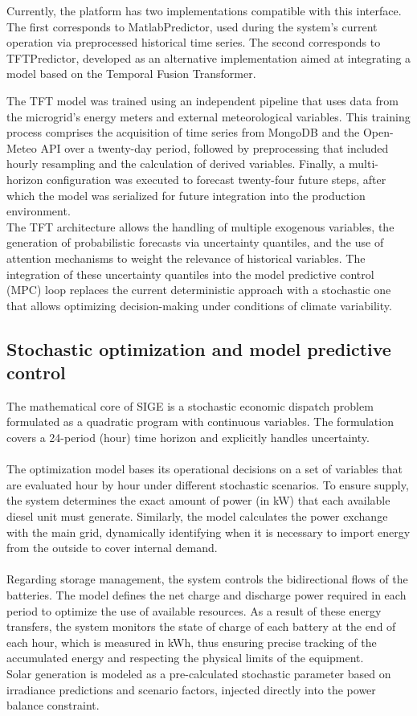 \documentclass[journal,article,submit,pdftex,moreauthors]{Definitions/mdpi}
\begin{document}
Currently, the platform has two implementations compatible with this interface. The first corresponds to MatlabPredictor, used during the system's current operation via preprocessed historical time series. The second corresponds to TFTPredictor, developed as an alternative implementation aimed at integrating a model based on the Temporal Fusion Transformer.

The TFT model was trained using an independent pipeline that uses data from the microgrid's energy meters and external meteorological variables. This training process comprises the acquisition of time series from MongoDB and the Open-Meteo API over a twenty-day period, followed by preprocessing that included hourly resampling and the calculation of derived variables. Finally, a multi-horizon configuration was executed to forecast twenty-four future steps, after which the model was serialized for future integration into the production environment.
\\
The TFT architecture allows the handling of multiple exogenous variables, the generation of probabilistic forecasts via uncertainty quantiles, and the use of attention mechanisms to weight the relevance of historical variables. The integration of these uncertainty quantiles into the model predictive control (MPC) loop replaces the current deterministic approach with a stochastic one that allows optimizing decision-making under conditions of climate variability.

\subsection{Stochastic optimization and model predictive control}

The mathematical core of SIGE is a stochastic economic dispatch problem formulated as a quadratic program with continuous variables. The formulation covers a 24-period (hour) time horizon and explicitly handles uncertainty.
\\\\
The optimization model bases its operational decisions on a set of variables that are evaluated hour by hour under different stochastic scenarios. To ensure supply, the system determines the exact amount of power (in kW) that each available diesel unit must generate. Similarly, the model calculates the power exchange with the main grid, dynamically identifying when it is necessary to import energy from the outside to cover internal demand.
\\\\
Regarding storage management, the system controls the bidirectional flows of the batteries. The model defines the net charge and discharge power required in each period to optimize the use of available resources. As a result of these energy transfers, the system monitors the state of charge of each battery at the end of each hour, which is measured in kWh, thus ensuring precise tracking of the accumulated energy and respecting the physical limits of the equipment.
\\
Solar generation is modeled as a pre-calculated stochastic parameter based on irradiance predictions and scenario factors, injected directly into the power balance constraint. 
\end{document}
